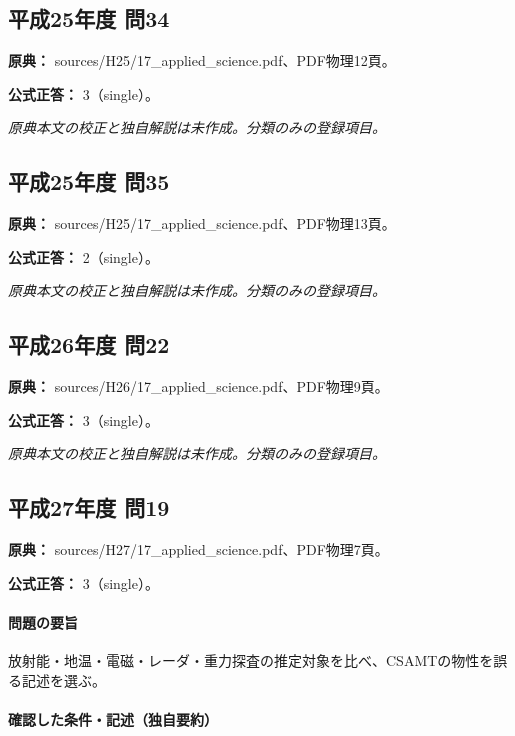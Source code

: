 \subsection{平成25年度 問34}
\label{q:h25-reg-applied-34}

\noindent\textbf{原典：} sources/H25/17\_applied\_science.pdf、PDF物理12頁。

\textbf{公式正答：} 3（single）。

\par\textit{原典本文の校正と独自解説は未作成。分類のみの登録項目。}

\subsection{平成25年度 問35}
\label{q:h25-reg-applied-35}

\noindent\textbf{原典：} sources/H25/17\_applied\_science.pdf、PDF物理13頁。

\textbf{公式正答：} 2（single）。

\par\textit{原典本文の校正と独自解説は未作成。分類のみの登録項目。}

\subsection{平成26年度 問22}
\label{q:h26-reg-applied-22}

\noindent\textbf{原典：} sources/H26/17\_applied\_science.pdf、PDF物理9頁。

\textbf{公式正答：} 3（single）。

\par\textit{原典本文の校正と独自解説は未作成。分類のみの登録項目。}

\subsection{平成27年度 問19}
\label{q:h27-reg-applied-19}

\noindent\textbf{原典：} sources/H27/17\_applied\_science.pdf、PDF物理7頁。

\textbf{公式正答：} 3（single）。

\paragraph{問題の要旨} 放射能・地温・電磁・レーダ・重力探査の推定対象を比べ、CSAMTの物性を誤る記述を選ぶ。

\paragraph{確認した条件・記述（独自要約）}\mbox{}\par

